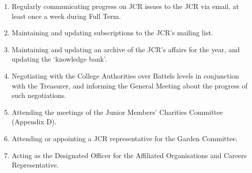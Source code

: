 \begin{enumerate}
	\item Regularly communicating progress on JCR issues to the JCR via email, at least once a week during Full Term.
	\item Maintaining and updating subscriptions to the JCR's mailing list.
	\item Maintaining and updating an archive of the JCR's affairs for the year, and updating the `knowledge bank'.
	\item Negotiating with the College Authorities over Battels levels in conjunction with the Treasurer, and informing the General Meeting about the progress of such negotiations.
	\item Attending the meetings of the Junior Members' Charities Committee (Appendix D).
	\item Attending or appointing a JCR representative for the Garden Committee.
	\item Acting as the Designated Officer for the Affiliated Organisations and Careers Representative.
\end{enumerate}
